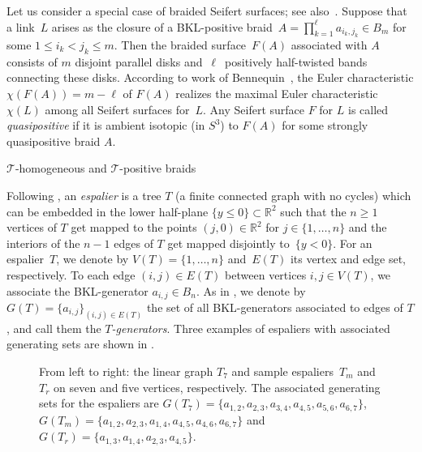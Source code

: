 \documentclass{amsart}
\makeatletter
\renewcommand\subsection{\@startsection{subsection}{2}%
  \z@{-.5\linespacing\@plus-.7\linespacing}{.5\linespacing}%
  {\normalfont\scshape}}
\theoremstyle{definition}
\theoremstyle{remark}
\theoremstyle{plain}
\newcommand{\R}{\mathbb{R}}
\newcommand{\T}{\mathcal{T}}
\newcommand{\sigij}{a_{i,j}}
\makeatother
\begin{document}
Let us consider a special case of braided Seifert surfaces; see also~\cite{rudolph_braidedsurfaces,Rudolph_surfaces}. Suppose that a link~$L$ arises as the closure of a BKL-positive braid~$A = \prod_{k=1}^\ell a_{i_k, j_k} \in B_m$ for some $1 \leq i_k < j_k \leq m$. Then the braided surface~$F(A)$ associated with $A$ %
consists of $m$ disjoint parallel disks and~$\ell$~positively half-twisted bands connecting these disks. According to work of Bennequin~\cite{bennequin}, the Euler characteristic $\chi(F(A))=m-\ell$ of $F(A)$ realizes the maximal Euler characteristic $\chi(L)$ among all Seifert surfaces for~$L$. Any Seifert surface $F$ for $L$ is called \emph{quasipositive} if it is ambient isotopic (in $S^3$) to $F(A)$ for some strongly quasipositive braid $A$.

\subsection{\texorpdfstring{$\T$-homogeneous}{T-homogeneous} and \texorpdfstring{$\T$-positive}{T-positive} braids}\label{subsubsec:T-homo}

Following \cite{Rudolph_Hopf_plumbing}, an \emph{espalier} is a tree $T$ (a finite connected graph with no cycles) which can be embedded in the lower half-plane $\{y \leq 0\}\subset\R^2$ such that the $n \geq 1$ vertices of $T$ get mapped to the points $(j,0)\in \R^2$ for $j \in \{1, \dots,n\}$ and the interiors of the $n-1$ edges of $T$ get mapped disjointly to~$\{y < 0\}$. For an espalier~$T$, we denote by $V(T)=\{1, \dots,n\}$ and~$E(T)$ its vertex and edge set, respectively. To each edge $(i,j)\in E(T)$ between vertices $i,j \in V(T)$, we associate the BKL-generator $\sigij \in B_n$. As in \cite{banfield}, we denote by $G(T)=\{\sigij\}_{(i,j) \in E(T)}$ the set of all BKL-generators associated to edges of $T$, and call them the %
 \emph{$T$-generators}. Three examples of espaliers with associated generating sets are shown in .

\vspace{1em}

\begin{figure}[htbp] 
	 \centering
     \def\svgwidth{1\columnwidth}
	 
	\caption{From left to right: the linear graph $T_7$ and sample espaliers~$T_m$ and~$T_r$ on seven and five vertices, respectively. The associated generating sets for the espaliers are $G(T_7)=\{a_{1,2}, a_{2,3}, a_{3,4}, a_{4,5}, a_{5,6}, a_{6,7}\}$, $G(T_m)=\{a_{1,2}, a_{2,3}, a_{1,4}, a_{4,5}, a_{4,6}, a_{6,7}\}$ and $G(T_r)=\{a_{1,3}, a_{1,4}, a_{2,3}, a_{4,5}\}$.}
    \label{fig:espaliers}
\end{figure}
\end{document}
